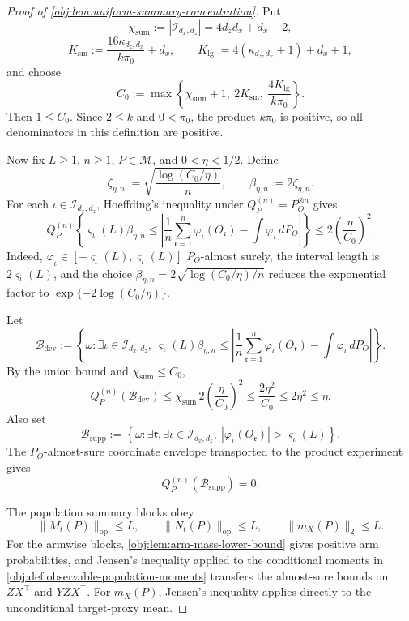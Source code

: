 \begin{proof}[Proof of \cref{obj:lem:uniform-summary-concentration}]
Put
\[
\chi_{\mathrm{sum}}:=|\mathcal I_{d_x,d_z}|=4d_zd_x+d_x+2,
\]
\[
K_{\mathrm{sm}}:=\frac{16\kappa_{d_z,d_x}}{k\pi_0}+d_x,
\qquad
K_{\mathrm{lg}}:=4(\kappa_{d_z,d_x}+1)+d_x+1,
\]
and choose
\[
C_0:=
\max\left\{\chi_{\mathrm{sum}}+1,\ 2K_{\mathrm{sm}},\
\frac{4K_{\mathrm{lg}}}{k\pi_0}\right\}.
\]
Then \(1\le C_0\).  Since \(2\le k\) and \(0<\pi_0\), the product
\(k\pi_0\) is positive, so all denominators in this definition are positive.  %

Now fix \(L\ge1\), \(n\ge1\), \(P\in\mathcal M\), and
\(0<\eta<1/2\).  Define
\[
\zeta_{\eta,n}:=
\sqrt{\frac{\log(C_0/\eta)}{n}},
\qquad
\beta_{\eta,n}:=2\zeta_{\eta,n}.
\]
For each \(\iota\in\mathcal I_{d_x,d_z}\), Hoeffding's inequality under
\(Q_P^{(n)}=P_O^{\otimes n}\) gives
\[
Q_P^{(n)}
\left\{
\varsigma_\iota(L)\beta_{\eta,n}
\le
\left|
\frac1n\sum_{\mathfrak r=1}^n\varphi_\iota(O_{\mathfrak r})
-
\int \varphi_\iota\,dP_O
\right|
\right\}
\le
2\left(\frac{\eta}{C_0}\right)^2 .
\]
Indeed, \(\varphi_\iota\in[-\varsigma_\iota(L),\varsigma_\iota(L)]\)
\(P_O\)-almost surely, the interval length is \(2\varsigma_\iota(L)\), and the
choice \(\beta_{\eta,n}=2\sqrt{\log(C_0/\eta)/n}\) reduces the exponential
factor to \(\exp\{-2\log(C_0/\eta)\}\).  %

Let
\[
\mathcal B_{\mathrm{dev}}
:=
\left\{\omega:\exists\iota\in\mathcal I_{d_x,d_z},\
\varsigma_\iota(L)\beta_{\eta,n}
\le
\left|
\frac1n\sum_{\mathfrak r=1}^n\varphi_\iota(O_{\mathfrak r})
-
\int \varphi_\iota\,dP_O
\right|\right\}.
\]
By the union bound and \(\chi_{\mathrm{sum}}\le C_0\),
\[
Q_P^{(n)}(\mathcal B_{\mathrm{dev}})
\le
\chi_{\mathrm{sum}}\,2\left(\frac{\eta}{C_0}\right)^2
\le
\frac{2\eta^2}{C_0}
\le
2\eta^2
\le
\eta .
\]
Also set
\[
\mathcal B_{\mathrm{supp}}
:=
\left\{\omega:\exists \mathfrak r,\exists\iota\in\mathcal I_{d_x,d_z},\
|\varphi_\iota(O_{\mathfrak r})|>\varsigma_\iota(L)\right\}.
\]
The \(P_O\)-almost-sure coordinate envelope transported to the product
experiment gives
\[
Q_P^{(n)}(\mathcal B_{\mathrm{supp}})=0 .
\]  %

The population summary blocks obey
\[
\|M_t(P)\|_{\mathrm{op}}\le L,\qquad
\|N_t(P)\|_{\mathrm{op}}\le L,\qquad
\|m_X(P)\|_2\le L .
\]
For the armwise blocks, \cref{obj:lem:arm-mass-lower-bound} gives positive
arm probabilities, and Jensen's inequality applied to the conditional moments
in \cref{obj:def:observable-population-moments} transfers the almost-sure
bounds on \(ZX^\top\) and \(YZX^\top\).  For \(m_X(P)\), Jensen's inequality
applies directly to the unconditional target-proxy mean.  %


\end{proof}
